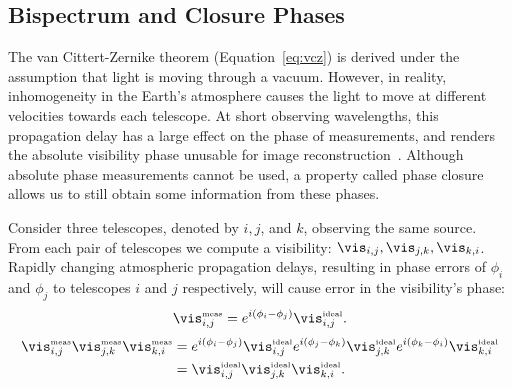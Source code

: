 

\subsection{Bispectrum and Closure Phases }
\label{sec:bispec}


The van Cittert-Zernike theorem (Equation~\ref{eq:vcz}) is derived under the assumption that light is moving through a vacuum. 
However, in reality, inhomogeneity in the Earth's atmosphere causes the light to move at different velocities towards each telescope. At short observing wavelengths, this propagation delay has a large effect on the phase of measurements, and renders the absolute visibility phase unusable for image reconstruction~\cite{monnier2013radio}. Although absolute phase measurements cannot be used, a property called phase closure allows us to still obtain some information from these phases. 

Consider three telescopes, denoted by $i, j$, and $k$, observing the same source. From each pair of telescopes we compute a visibility: $\vis_{i,j}, \vis_{j,k}, \vis_{k,i}$. Rapidly changing atmospheric propagation delays, resulting in phase errors of $\phi_i$ and $\phi_j$ to telescopes $i$ and $j$ respectively, will cause error in the visibility's phase: 
\begin{equation} \vis_{i,j}^{\mbox{\tiny{meas}}} = e^{i(\phi_i - \phi_j)}\vis_{i,j}^{\mbox{\tiny{ideal}}}. 
\end{equation}
\begin{align}  
\notag \vis^{\mbox{\tiny{meas}}}_{i,j}\vis^{\mbox{\tiny{meas}}}_{j,k}\vis^{\mbox{\tiny{meas}}}_{k,i} &= e^{i(\phi_i-\phi_j)}\vis^{\mbox{\tiny{ideal}}}_{i,j}e^{i(\phi_j-\phi_k)}\vis^{\mbox{\tiny{ideal}}}_{j,k}e^{i(\phi_k-\phi_i)}\vis^{\mbox{\tiny{ideal}}}_{k,i} \\
&=\vis^{\mbox{\tiny{ideal}}}_{i,j}\vis^{\mbox{\tiny{ideal}}}_{j,k}\vis^{\mbox{\tiny{ideal}}}_{k,i}. %
\label{eq:phaseclosure}
 \end{align}


